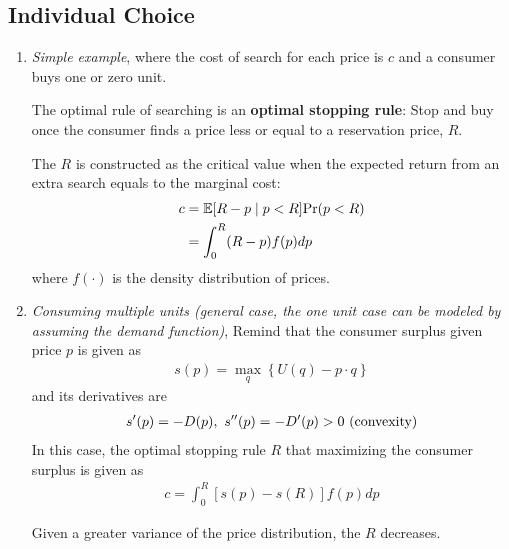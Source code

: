 \documentclass[11pt]{elegantbook}
\begin{document}
\subsection{Individual Choice}
\begin{enumerate}
    \item \textit{Simple example}, where the cost of search for each price is $c$ and a consumer buys one or zero unit.
    \begin{definition}
        The optimal rule of searching is an \textbf{optimal stopping rule}: Stop and buy once the consumer finds a price less or equal to a reservation price, $R$.
    \end{definition}
    The $R$ is constructed as the critical value when the expected return from an extra search equals to the marginal cost:
    \begin{equation}
        \begin{aligned}
            c&=\mathbb{E}[R-p\mid p<R] \textnormal{Pr}(p<R)\\
            &=\int_0^R(R-p)f(p)dp
        \end{aligned}
        \nonumber
    \end{equation}
    where $f(\cdot)$ is the density distribution of prices.
    \item \textit{Consuming multiple units (general case, the one unit case can be modeled by assuming the demand function)}, Remind that the consumer surplus given price $p$ is given as
    \begin{equation}
        \begin{aligned}
            s(p)=\max_q\left\{U(q)-p\cdot q\right\}
        \end{aligned}
        \nonumber
    \end{equation}
    and its derivatives are
    \begin{equation}
        \begin{aligned}
            s'(p)=-D(p),\ s''(p)=-D'(p)>0 \textnormal{ (convexity)}
        \end{aligned}
        \nonumber
    \end{equation}
    In this case, the optimal stopping rule $R$ that maximizing the consumer surplus is given as
    \begin{equation}
        \begin{aligned}
            c=\int_0^R[s(p)-s(R)]f(p)dp
        \end{aligned}
        \nonumber
    \end{equation}
    \begin{note}
        Given a greater variance of the price distribution, the $R$ decreases.
    \end{note}
\end{enumerate}
\end{document}
